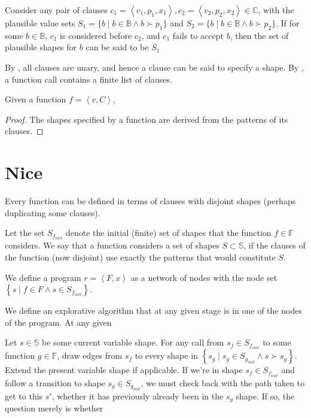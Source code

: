 \begin{corollary} Consider any pair of clauses $c_1=\left\langle v_1,p_1,x_1
\right\rangle, c_2=\left\langle v_2,p_2,x_2 \right\rangle \in\mathbb{C}$, with
the plausible value sets $S_1=\{b\mid b\in\mathbb{B} \wedge b \succ p_1\}$ and
$S_2=\{b\mid b\in\mathbb{B} \wedge b \succ p_2\}$. If for some
$b\in\mathbb{B}$, $c_1$ is considered before $c_2$, and $c_1$ fails to accept
$b$, then the set of plausible shapes for $b$ can be said to be
$S_1$\end{corollary}

By , all clauses are unary, and hence a clause
can be said to specify a shape. By , a
function call contains a finite list of clauses.

\begin{theorem} Given a function $f=\left\langle v,C\right\rangle$, \end{theorem}

\begin{proof} The shapes specified by a function are derived from the patterns
of its clauses.\end{proof}

\section{Nice}

Every function can be defined in terms of clauses with disjoint shapes (perhaps
duplicating some clauses).

Let the set $S_{f_{init}}$ denote the initial (finite) set of shapes that the
function $f\in\mathbb{F}$ considers. We say that a function considers a set of
shapes $S\subset\mathbb{S}$, if the clauses of the function (now disjoint) use
exactly the patterns that would constitute $S$.

We define a program $r= \left\langle F,x \right\rangle$ as a network of nodes
with the node set $\left\{ s \mid f\in F \wedge s\in S_{f_{init}}\right\}$.

We define an explorative algorithm that at any given stage is in one of the nodes of the program. At any given  

Let $s\in\mathbb{S}$ be some current variable shape. For any call from $s_f\in
S_{f_{init}}$ to some function $g\in\mathbb{F}$, draw edges from $s_f$ to every
shape in $\left\{ s_g\mid s_g\in S_{g_{init}} \wedge s\succ s_g \right\}$.
Extend the present variable shape if applicable. If we're in shape $s_f\in
S_{f_{init}}$ and follow a transition to shape $s_g\in S_{g_{init}}$, we must
check back with the path taken to get to this $s'$, whether it has previously
already been in the $s_g$ shape. If so, the question merely is whether 




